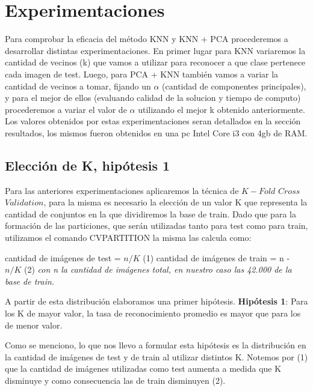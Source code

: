 \newpage
\section{Experimentaciones}


Para comprobar la eficacia del método KNN y KNN + PCA procederemos a desarrollar distintas experimentaciones. En primer lugar para KNN variaremos la cantidad de vecinos (k) que vamos a utilizar para reconocer a que clase pertenece cada imagen de test. Luego, para PCA + KNN también vamos a variar la cantidad de vecinos a tomar, fijando un $\alpha$ (cantidad de componentes principales),  y para el mejor de ellos (evaluando calidad de la solucion y tiempo de computo) procederemos a variar el valor de $\alpha$ utilizando el mejor k obtenido  anteriormente. Los valores obtenidos por estas experimentaciones seran detallados en la sección resultados, los mismos fueron obtenidos en una pc Intel Core i3 con 4gb de RAM.\newline

\subsection{Elección de K, hipótesis 1}


 Para las anteriores experimentaciones aplicaremos la técnica de $K-Fold$ $Cross$ $Validation$, para la misma es necesario la elección de un valor K que representa la cantidad de conjuntos en la que dividiremos la base de train. Dado que para la formación de las particiones, que serán utilizadas tanto para test como para train, utilizamos el comando CVPARTITION la misma las calcula como:\newline
 
 cantidad de imágenes de test = $n/K$  (1)\newline
  cantidad de imágenes de train = n - $n/K$ (2)\newline
  \textit{con n la cantidad de imágenes total, en nuestro caso las 42.000 de la base de train.}
  
A partir de esta distribución elaboramos una primer hipótesis. 
 \textbf{Hipótesis 1}: Para los K de mayor valor, la tasa de reconocimiento promedio es mayor que para los de menor valor.  
 
 Como se menciono, lo que nos llevo a formular esta hipótesis es la distribución en la cantidad de imágenes de test y de train al utilizar distintos K. Notemos por (1) que la cantidad de imágenes utilizadas como test aumenta a medida que K disminuye y como consecuencia las de train disminuyen (2). 
 
